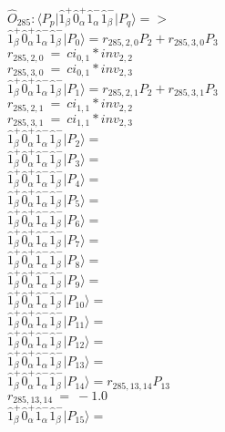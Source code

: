 \documentclass[14pt]{article}
\begin{document}
    $\hat{O}_{285}:  \langle{P_p}\vert \hat{1}_{\beta}^{+}\hat{0}_{\alpha}^{+}\hat{1}_{\alpha}^{-}\hat{1}_{\beta}^{-} \vert{P_q}\rangle => $ \\ 
    $ \hat{1}_{\beta}^{+}\hat{0}_{\alpha}^{+}\hat{1}_{\alpha}^{-}\hat{1}_{\beta}^{-} \vert{P_{0}}\rangle = {r}_{285,2,0}P_{2}+{r}_{285,3,0}P_{3} $ \\ 
    ${r}_{285,2,0}\ =\ {ci}_{0,1}*{inv}_{2,2} $ \\ 
    ${r}_{285,3,0}\ =\ {ci}_{0,1}*{inv}_{2,3} $ \\ 
    $ \hat{1}_{\beta}^{+}\hat{0}_{\alpha}^{+}\hat{1}_{\alpha}^{-}\hat{1}_{\beta}^{-} \vert{P_{1}}\rangle = {r}_{285,2,1}P_{2}+{r}_{285,3,1}P_{3} $ \\ 
    ${r}_{285,2,1}\ =\ {ci}_{1,1}*{inv}_{2,2} $ \\ 
    ${r}_{285,3,1}\ =\ {ci}_{1,1}*{inv}_{2,3} $ \\ 
    $ \hat{1}_{\beta}^{+}\hat{0}_{\alpha}^{+}\hat{1}_{\alpha}^{-}\hat{1}_{\beta}^{-} \vert{P_{2}}\rangle =  $ \\ 
    $ \hat{1}_{\beta}^{+}\hat{0}_{\alpha}^{+}\hat{1}_{\alpha}^{-}\hat{1}_{\beta}^{-} \vert{P_{3}}\rangle =  $ \\ 
    $ \hat{1}_{\beta}^{+}\hat{0}_{\alpha}^{+}\hat{1}_{\alpha}^{-}\hat{1}_{\beta}^{-} \vert{P_{4}}\rangle =  $ \\ 
    $ \hat{1}_{\beta}^{+}\hat{0}_{\alpha}^{+}\hat{1}_{\alpha}^{-}\hat{1}_{\beta}^{-} \vert{P_{5}}\rangle =  $ \\ 
    $ \hat{1}_{\beta}^{+}\hat{0}_{\alpha}^{+}\hat{1}_{\alpha}^{-}\hat{1}_{\beta}^{-} \vert{P_{6}}\rangle =  $ \\ 
    $ \hat{1}_{\beta}^{+}\hat{0}_{\alpha}^{+}\hat{1}_{\alpha}^{-}\hat{1}_{\beta}^{-} \vert{P_{7}}\rangle =  $ \\ 
    $ \hat{1}_{\beta}^{+}\hat{0}_{\alpha}^{+}\hat{1}_{\alpha}^{-}\hat{1}_{\beta}^{-} \vert{P_{8}}\rangle =  $ \\ 
    $ \hat{1}_{\beta}^{+}\hat{0}_{\alpha}^{+}\hat{1}_{\alpha}^{-}\hat{1}_{\beta}^{-} \vert{P_{9}}\rangle =  $ \\ 
    $ \hat{1}_{\beta}^{+}\hat{0}_{\alpha}^{+}\hat{1}_{\alpha}^{-}\hat{1}_{\beta}^{-} \vert{P_{10}}\rangle =  $ \\ 
    $ \hat{1}_{\beta}^{+}\hat{0}_{\alpha}^{+}\hat{1}_{\alpha}^{-}\hat{1}_{\beta}^{-} \vert{P_{11}}\rangle =  $ \\ 
    $ \hat{1}_{\beta}^{+}\hat{0}_{\alpha}^{+}\hat{1}_{\alpha}^{-}\hat{1}_{\beta}^{-} \vert{P_{12}}\rangle =  $ \\ 
    $ \hat{1}_{\beta}^{+}\hat{0}_{\alpha}^{+}\hat{1}_{\alpha}^{-}\hat{1}_{\beta}^{-} \vert{P_{13}}\rangle =  $ \\ 
    $ \hat{1}_{\beta}^{+}\hat{0}_{\alpha}^{+}\hat{1}_{\alpha}^{-}\hat{1}_{\beta}^{-} \vert{P_{14}}\rangle = {r}_{285,13,14}P_{13} $ \\ 
    ${r}_{285,13,14}\ =\ -1.0 $ \\ 
    $ \hat{1}_{\beta}^{+}\hat{0}_{\alpha}^{+}\hat{1}_{\alpha}^{-}\hat{1}_{\beta}^{-} \vert{P_{15}}\rangle =  $ \\ 
    
\end{document}
